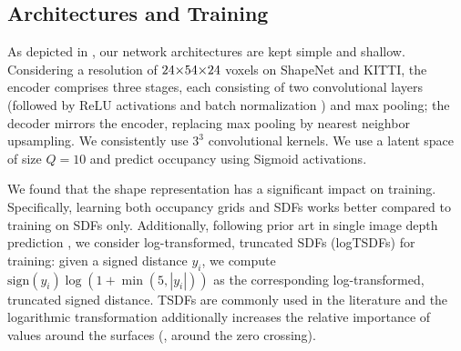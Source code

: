 \subsection{Architectures and Training}
\label{sec:training}



As depicted in , our network architectures are kept simple and shallow. Considering a resolution of $24 \operatorname*{\!\times\!} 54 \operatorname*{\!\times\!} 24$ voxels on ShapeNet and KITTI, the encoder comprises three stages, each consisting of two convolutional layers (followed by $\text{ReLU}$ activations and batch normalization \citep{Ioffe2015ICML}) and max pooling; the decoder mirrors the encoder, replacing max pooling by nearest neighbor upsampling. We consistently use $3^3$ convolutional kernels. We use a latent space of size $Q = 10$ and predict occupancy using Sigmoid activations.

We found that the shape representation has a significant impact on training. Specifically, learning both occupancy grids and SDFs works better compared to training on SDFs only. Additionally, following prior art in single image depth prediction \citep{Eigen2015ICCV,Eigen2014NIPS,Laina2016THREEDV}, we consider log-transformed, truncated SDFs (logTSDFs) for training: given a signed distance $y_i$, we compute $\text{sign}(y_i)\log(1 + \min(5, |y_i|))$ as the corresponding log-transformed, truncated signed distance. TSDFs are commonly used in the literature \citep{Newcombe2011ISMAR,Riegler2017THREEDV,Dai2017CVPRa,Engelmann2016GCPR,Curless1996SIGGRAPH} and the logarithmic transformation additionally increases the relative importance of values around the surfaces (\ie, around the zero crossing).



